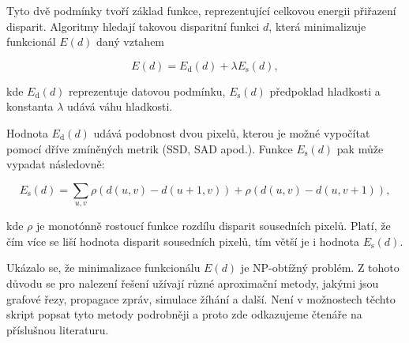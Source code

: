 Tyto dvě podmínky tvoří základ funkce, reprezentující celkovou energii přiřazení disparit. Algoritmy hledají takovou disparitní funkci $d$, která minimalizuje funkcionál $E(d)$ daný vztahem

\begin{equation}
    \label{funkcional}
	E(d) = E_\mathrm{d}(d) + \lambda E_\mathrm{s}(d),
\end{equation}

kde $E_\mathrm{d}(d)$ reprezentuje datovou podmínku, $E_\mathrm{s}(d)$ předpoklad hladkosti a konstanta $\lambda$ udává váhu hladkosti.

Hodnota $E_\mathrm{d}(d)$ udává podobnost dvou pixelů, kterou je možné vypočítat pomocí dříve zmíněných metrik (SSD, SAD apod.). Funkce $E_\mathrm{s}(d)$ pak může vypadat následovně:

\begin{equation}
    \label{funkcional2}
	E_\mathrm{s}(d) = \sum\limits_{u, v}  \rho(d(u,v) - d(u+1, v)) + \rho(d(u,v) - d(u, v+1)),
\end{equation}

kde $\rho$ je monotónně rostoucí funkce rozdílu disparit sousedních pixelů. Platí, že čím více se liší hodnota disparit sousedních pixelů, tím větší je i hodnota $E_\mathrm{s}(d)$.

Ukázalo se, že minimalizace funkcionálu $E(d)$ je NP-obtížný problém. Z tohoto důvodu se pro nalezení řešení užívají různé aproximační metody, jakými jsou grafové řezy, propagace zpráv, simulace žíhání a další. Není v možnostech těchto skript popsat tyto metody podrobněji a proto zde odkazujeme čtenáře na příslušnou literaturu.

